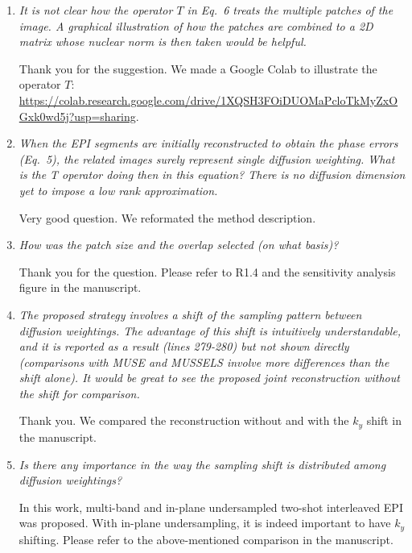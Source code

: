 \documentclass[a4paper,11pt,twoside]{report}
\begin{document}
\begin{enumerate}
    \item \textit{It is not clear how the operator $T$ in Eq.~6 treats the multiple patches of the image. A graphical illustration of how the patches are combined to a 2D matrix whose nuclear norm is then taken would be helpful.}

    Thank you for the suggestion. We made a Google Colab to illustrate the operator $T$: \url{https://colab.research.google.com/drive/1XQSH3FOiDUOMaPcloTkMyZxOGxk0wd5j?usp=sharing}.

    \item \textit{When the EPI segments are initially reconstructed to obtain the phase errors (Eq.~5), the related images surely represent single diffusion weighting. What is the T operator doing then in this equation? There is no diffusion dimension yet to impose a low rank approximation.}

    \hspace{1em} Very good question. We reformated the method description.

    \item \textit{How was the patch size and the overlap selected (on what basis)?}

    \hspace{1em} Thank you for the question.
    Please refer to R1.4 and the sensitivity analysis figure
    in the manuscript.

    \item \textit{The proposed strategy involves a shift of the sampling pattern between diffusion weightings. The advantage of this shift is intuitively understandable, and it is reported as a result (lines 279-280) but not shown directly (comparisons with MUSE and MUSSELS involve more differences than the shift alone). It would be great to see the proposed joint reconstruction without the shift for comparison.}

    \hspace{1em} Thank you. We compared the reconstruction
    without and with the $k_y$ shift in the manuscript.

    \item \textit{Is there any importance in the way the sampling shift is distributed among diffusion weightings?}

    \hspace{1em} In this work, multi-band and in-plane undersampled
    two-shot interleaved EPI was proposed.
    With in-plane undersampling,
    it is indeed important to have $k_y$ shifting.
    Please refer to the above-mentioned comparison in the manuscript.


\end{enumerate}
\end{document}
